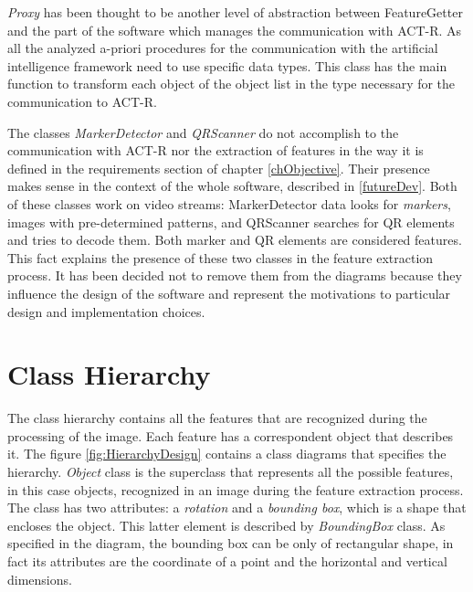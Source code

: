 	\emph{Proxy} has been thought to be another level of abstraction between FeatureGetter and the part of the software which manages the communication with ACT-R. As all the analyzed a-priori procedures for the communication with the artificial intelligence framework need to use specific data types. This class has the main function to transform each object of the object list in the type necessary for the communication to ACT-R.

	The classes \emph{MarkerDetector} and \emph{QRScanner} do not accomplish to the communication with ACT-R nor the extraction of features in the way it is defined in the requirements section of chapter \ref{chObjective}. Their presence makes sense in the context of the whole software, described in \ref{futureDev}. Both of these classes work on video streams: MarkerDetector data looks for \emph{markers}, images with pre-determined patterns, and QRScanner searches for \mbox{QR} elements and tries to decode them. Both marker and \mbox{QR} elements are considered features. This fact explains the presence of these two classes in the feature extraction process. It has been decided not to remove them from the diagrams because they influence the design of the software and represent the motivations to particular design and implementation choices.
 		

	
	\section{Class Hierarchy}\label{classHierarchy}
	The class hierarchy contains all the features that are recognized during the processing of the image. Each feature has a correspondent object that describes it. 
	The figure \ref{fig:HierarchyDesign} contains a class diagrams that specifies the hierarchy. 
	\emph{Object} class is the superclass that represents all the possible features, in this case objects, recognized in an image during the feature extraction process. The class has two attributes: a \emph{rotation} and a \emph{bounding box}, which is a shape that encloses the object. This latter element is described by \emph{BoundingBox} class. As specified in the diagram, the bounding box can be only of rectangular shape, in fact its attributes are the coordinate of a point and the horizontal and vertical dimensions.

